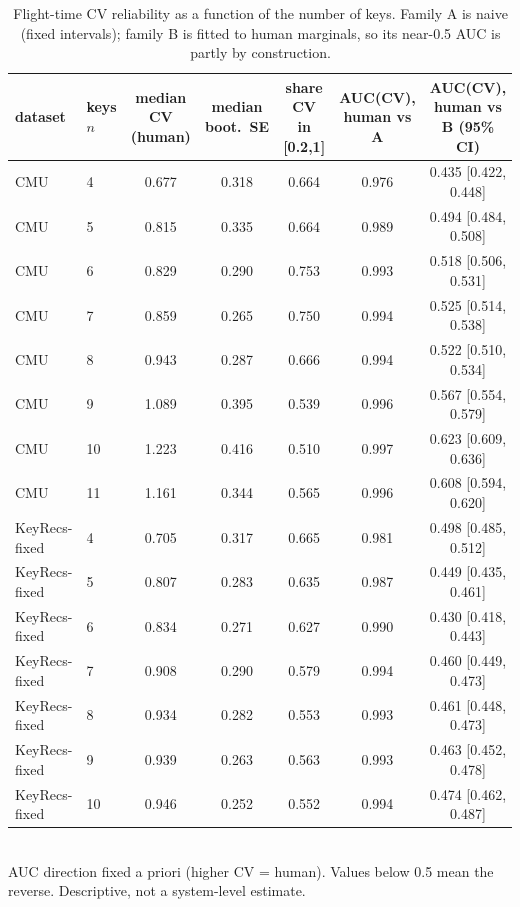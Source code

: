 \begin{table}[t]
\caption{Flight-time CV reliability as a function of the number of keys. Family A is naive (fixed intervals); family B is fitted to human marginals, so its near-0.5 AUC is partly by construction.}
\label{tab:cv}
\centering
\small
\begin{tabular}{llccccc}
\toprule
dataset & keys $n$ & median CV (human) & median boot.\ SE & share CV in [0.2,1] & AUC(CV), human vs A & AUC(CV), human vs B (95\% CI) \\
\midrule
CMU & 4 & 0.677 & 0.318 & 0.664 & 0.976 & 0.435 [0.422, 0.448] \\
CMU & 5 & 0.815 & 0.335 & 0.664 & 0.989 & 0.494 [0.484, 0.508] \\
CMU & 6 & 0.829 & 0.290 & 0.753 & 0.993 & 0.518 [0.506, 0.531] \\
CMU & 7 & 0.859 & 0.265 & 0.750 & 0.994 & 0.525 [0.514, 0.538] \\
CMU & 8 & 0.943 & 0.287 & 0.666 & 0.994 & 0.522 [0.510, 0.534] \\
CMU & 9 & 1.089 & 0.395 & 0.539 & 0.996 & 0.567 [0.554, 0.579] \\
CMU & 10 & 1.223 & 0.416 & 0.510 & 0.997 & 0.623 [0.609, 0.636] \\
CMU & 11 & 1.161 & 0.344 & 0.565 & 0.996 & 0.608 [0.594, 0.620] \\
KeyRecs-fixed & 4 & 0.705 & 0.317 & 0.665 & 0.981 & 0.498 [0.485, 0.512] \\
KeyRecs-fixed & 5 & 0.807 & 0.283 & 0.635 & 0.987 & 0.449 [0.435, 0.461] \\
KeyRecs-fixed & 6 & 0.834 & 0.271 & 0.627 & 0.990 & 0.430 [0.418, 0.443] \\
KeyRecs-fixed & 7 & 0.908 & 0.290 & 0.579 & 0.994 & 0.460 [0.449, 0.473] \\
KeyRecs-fixed & 8 & 0.934 & 0.282 & 0.553 & 0.993 & 0.461 [0.448, 0.473] \\
KeyRecs-fixed & 9 & 0.939 & 0.263 & 0.563 & 0.993 & 0.463 [0.452, 0.478] \\
KeyRecs-fixed & 10 & 0.946 & 0.252 & 0.552 & 0.994 & 0.474 [0.462, 0.487] \\
\bottomrule
\end{tabular}
\\[2pt]\footnotesize AUC direction fixed a priori (higher CV = human). Values below 0.5 mean the reverse. Descriptive, not a system-level estimate.
\end{table}
